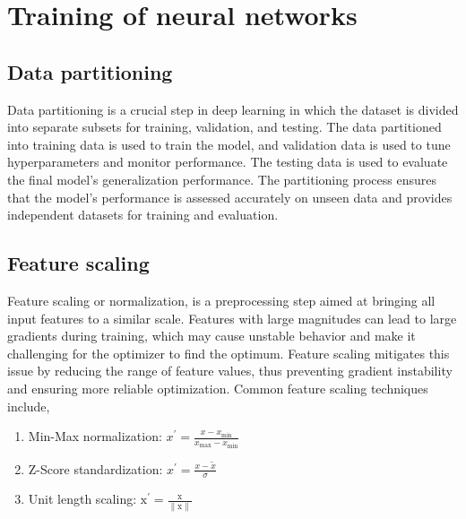 \section{Training of neural networks}
\subsection{Data partitioning}Data partitioning is a crucial step in deep learning in which the dataset is divided into separate subsets for training, validation, and testing. The data partitioned into training data is used to train the model, and validation data is used to tune hyperparameters and monitor performance. The testing data is used to evaluate the final model's generalization performance. The partitioning process ensures that the model's performance is assessed accurately on unseen data and provides independent datasets for training and evaluation. 
\subsection{Feature scaling}Feature scaling or normalization, is a preprocessing step aimed at bringing all input features to a similar scale. Features with large magnitudes can lead to large gradients during training, which may cause unstable behavior and make it challenging for the optimizer to find the optimum. Feature scaling mitigates this issue by reducing the range of feature values, thus preventing gradient instability and ensuring more reliable optimization. Common feature scaling techniques include,
\begin{enumerate}
\item Min-Max normalization: $x^{\prime}=\frac{x-x_{\min }}{x_{\max }-x_{\min }}$
\item Z-Score standardization: $x^{\prime}=\frac{x-\tilde{x}}{\sigma}$
\item Unit length scaling: $\mathrm{x}^{\prime}=\frac{\mathrm{x}}{\|\mathrm{x}\|}$
\end{enumerate}
